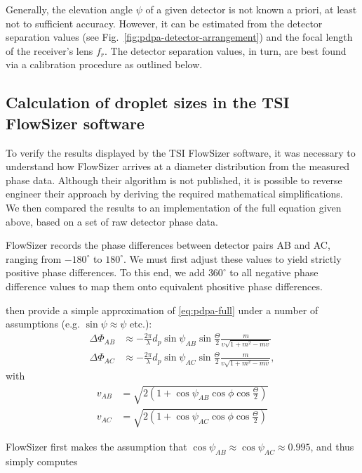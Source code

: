 \documentclass[11.5pt,oneside]{book}
\newcommand*{\figref}[1]{Fig.~\ref{#1}}
\begin{document}
Generally, the elevation angle $\psi$ of a given detector is not known
a priori, at least not to sufficient accuracy. 
However, it can be estimated from the detector separation values (see
\figref{fig:pdpa-detector-arrangement}) and the focal length of the
receiver's lens $f_r$. The detector separation values, in turn, are best found
via a calibration procedure as outlined below.

\subsection{Calculation of droplet sizes in the TSI FlowSizer software
\label{sec:flowsizeralg}}
To verify the results displayed by the TSI FlowSizer software, it was necessary to
understand how FlowSizer arrives at a diameter distribution from the measured
phase data. Although their algorithm is not published, it is possible to reverse
engineer their approach by deriving the required mathematical simplifications.
We then compared the results to an implementation of the full equation given
above, based on a set of raw detector phase data.

FlowSizer records the phase differences between detector pairs AB and AC,
ranging from $-180^\circ$ to $180^\circ$. We must first adjust these values to
yield strictly positive phase differences. To this end, we add $360^\circ$ to
all negative phase difference values to map them onto equivalent phositive phase
differences.

\citet{Albrecht03} then provide a simple approximation of \eqref{eq:pdpa-full}
under a number of assumptions (e.g. $\sin \psi \approx \psi$ etc.):
\begin{align}
    \Delta\Phi_{AB} &\approx -\frac{2\pi}{\lambda} d_p \sin \psi_{AB} \sin
    \frac{\Theta}{2}\frac{m}{v \sqrt{1 + m^2 - mv}}
    \label{eq:pdpa-phase-simple-ab}\\
    \Delta\Phi_{AC} &\approx -\frac{2\pi}{\lambda} d_p \sin \psi_{AC} \sin
    \frac{\Theta}{2}\frac{m}{v \sqrt{1 + m^2 - mv}}, \label{eq:pdpa-phase-simple-ac}
\end{align}
with 
\begin{align}
    v_{AB} &= \sqrt{2(1 + \cos \psi_{AB} \cos \phi \cos \frac{\Theta}{2})} \\
    v_{AC} &= \sqrt{2(1 + \cos \psi_{AC} \cos \phi \cos \frac{\Theta}{2})}
\end{align}

FlowSizer first makes the assumption that $\cos \psi_{AB} \approx \cos \psi_{AC} \approx
0.995$, and thus simply computes
\end{document}
